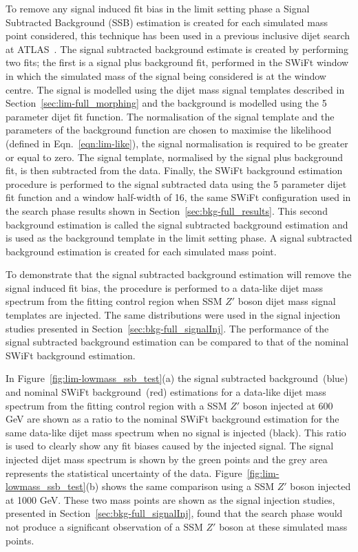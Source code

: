 To remove any signal induced fit bias in the limit setting phase a Signal Subtracted Background (SSB) estimation is
created for each simulated mass point considered, this technique has been used in a previous inclusive dijet search at ATLAS~\cite{dijet-mori17_paper}.
The signal subtracted background estimate is created by performing two fits;
the first is a signal plus background fit, performed in the SWiFt window
in which the simulated mass of the signal being considered is at the window centre.
The signal is modelled using the dijet mass signal templates described in Section~\ref{sec:lim-full_morphing}
and the background is modelled using the 5 parameter dijet fit function.
The normalisation of the signal template and the parameters of the background function are
chosen to maximise the likelihood (defined in Eqn.~\ref{eqn:lim-like}),
the signal normalisation is required to be greater or equal to zero.
The signal template, normalised by the signal plus background fit, is then subtracted from the data.
Finally, the SWiFt background estimation procedure is performed to the signal subtracted data using the 
5 parameter dijet fit function and a window half-width of 16, the same SWiFt configuration used in the search phase results shown in Section~\ref{sec:bkg-full_results}.
This second background estimation is called the signal subtracted background estimation and is used as the background template in the limit setting phase.
A signal subtracted background estimation is created for each simulated mass point.

To demonstrate that the signal subtracted background estimation will remove the signal induced fit bias,
the procedure is performed to a data-like dijet mass spectrum from the fitting control region when SSM $Z'$ boson dijet mass signal templates are injected.
The same distributions were used in the signal injection studies presented in Section~\ref{sec:bkg-full_signalInj}.
The performance of the signal subtracted background estimation can be compared to that of the nominal SWiFt background estimation.

In Figure~\ref{fig:lim-lowmass_ssb_test}(a) the signal subtracted background~(blue) and nominal SWiFt background~(red) estimations
for a data-like dijet mass spectrum from the fitting control region with a SSM $Z'$ boson injected at 600 GeV are
shown as a ratio to the nominal SWiFt background estimation for the same data-like dijet mass spectrum when no signal is injected (black).
This ratio is used to clearly show any fit biases caused by the injected signal.
The signal injected dijet mass spectrum is shown by the green points and the grey area represents the statistical uncertainty of the data.
Figure~\ref{fig:lim-lowmass_ssb_test}(b) shows the same comparison using a SSM $Z'$ boson injected at 1000 GeV.
These two mass points are shown as the signal injection studies, presented in Section~\ref{sec:bkg-full_signalInj},
found that the search phase would not produce a significant observation of a SSM $Z'$ boson at these simulated mass points. 

